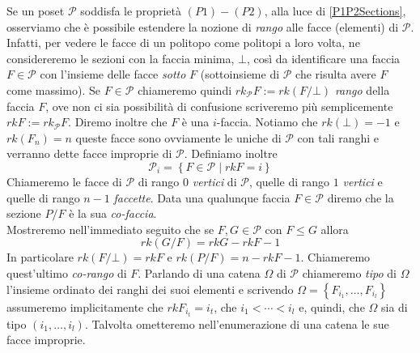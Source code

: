\documentclass[a4paper,12pt]{report}
\newcommand{\p}{\mathcal{P}}
\theoremstyle{plain}
\theoremstyle{definition}
\begin{document}
\par
Se un poset $\p$ soddisfa le propriet\`a $(P1)-(P2)$, alla luce di \ref{P1P2Sections}, osserviamo che \`e possibile estendere la nozione di \emph{rango}
alle facce (elementi) di $\p$.\\
Infatti, per vedere le facce di un politopo come politopi a loro volta, ne considereremo le sezioni con la faccia minima, $\bot$,
cos\`i da identificare una faccia $F\in\p$ con l'insieme delle facce \emph{sotto} $F$ (sottoinsieme di $\p$ che risulta avere $F$ come massimo).
Se $F\in\p$ chiameremo quindi $rk_\p F:=rk(F/\bot)$ \emph{rango} della faccia $F$, ove non ci sia possibilit\`a di confusione scriveremo
pi\`u semplicemente $rk F:=rk_\p F$. Diremo inoltre che $F$ \`e una $i$-faccia.
Notiamo che $rk(\bot)=-1$ e $rk(F_n)=n$ queste facce sono ovviamente le uniche di $\p$ con tali ranghi e verranno dette
facce improprie di $\p$.
Definiamo inoltre
\begin{equation*}
\p_i=\left\{F\in\p\mid rkF=i\right\}
\end{equation*}
Chiameremo le facce di $\p$ di rango $0$ \emph{vertici} di $\p$, quelle di rango $1$ \emph{vertici} e quelle di rango $n-1$ \emph{faccette}. Data 
una qualunque faccia $F\in\p$ diremo che la sezione $P/F$ \`e la sua \emph{co-faccia}.\\
Mostreremo nell'immediato seguito che se $F,G\in\p$ con $F\leq G$ allora
\begin{equation*}
rk(G/F)=rkG-rkF-1
\end{equation*}
In particolare $rk(F/\bot)=rkF$ e $rk(P/F)=n-rkF-1$. Chiameremo quest'ultimo \emph{co-rango} di $F$.
Parlando di una catena $\Omega$ di $\p$ chiameremo \emph{tipo} di $\Omega$ l'insieme ordinato dei ranghi dei suoi elementi e scrivendo 
$\Omega=\left\{F_{i_1},\dots,F_{i_l}\right\}$ assumeremo implicitamente che $rkF_{i_t}=i_t$, che $i_1<\cdots<i_l$ e, quindi,
che $\Omega$ sia di tipo $(i_1,\dots,i_l)$.
Talvolta ometteremo nell'enumerazione di una catena le sue facce improprie.\\
\end{document}
